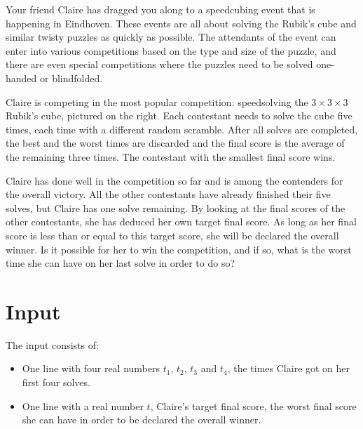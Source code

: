%
Your friend Claire has dragged you along to a speedcubing event that
is happening in Eindhoven. These events are all about solving the
Rubik's cube and similar twisty puzzles as quickly as possible.
The attendants of the event can enter into various competitions based
on the type and size of the puzzle, and there are even special
competitions where the puzzles need to be solved one-handed or
blindfolded.

Claire is competing in the most popular competition: speedsolving the
$3\times3\times3$ Rubik's cube, pictured on the right. Each contestant
needs to solve the cube five times, each time with a different random
scramble. After all solves are completed, the best and the worst times
are discarded and the final score is the average of the remaining
three times. The contestant with the smallest final score wins.

Claire has done well in the competition so far and is among the
contenders for the overall victory. All the other contestants have
already finished their five solves, but Claire has one solve remaining.
By looking at the final scores of the other contestants, she has deduced her
own target final score. As long as her final score is less than or equal to
this target score, she will be declared the overall winner.
Is it possible for her to win the competition, and if so, what is the
worst time she can have on her last solve in order to do so?

\section*{Input}

The input consists of:

\begin{itemize}
  \item One line with four real numbers $t_1$, $t_2$, $t_3$ and $t_4$, the times
    Claire got on her first four solves.
  \item One line with a real number $t$, Claire's target final score, the worst
      final score she can have in order to be declared the overall winner.
\end{itemize}

